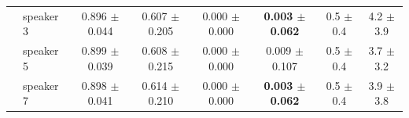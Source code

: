\begin{table}
\begin{tabular}{ll!{\vrule width 1.2pt}cc!{\vrule width 1.2pt}cc!{\vrule width 1.2pt}cc}
 & speaker 3 & 0.896 {\scriptsize $\pm$0.044} & 0.607 {\scriptsize $\pm$0.205} & 0.000 {\scriptsize $\pm$0.000} & \bfseries 0.003 {\scriptsize $\pm$0.062} & 0.5 {\scriptsize $\pm$0.4} & 4.2 {\scriptsize $\pm$3.9} \\
 & speaker 5 & 0.899 {\scriptsize $\pm$0.039} & 0.608 {\scriptsize $\pm$0.215} & 0.000 {\scriptsize $\pm$0.000} & 0.009 {\scriptsize $\pm$0.107} & 0.5 {\scriptsize $\pm$0.4} & 3.7 {\scriptsize $\pm$3.2} \\
 & speaker 7 & 0.898 {\scriptsize $\pm$0.041} & 0.614 {\scriptsize $\pm$0.210} & 0.000 {\scriptsize $\pm$0.000} & \bfseries 0.003 {\scriptsize $\pm$0.062} & 0.5 {\scriptsize $\pm$0.4} & 3.9 {\scriptsize $\pm$3.8} \\
\bottomrule
\end{tabular}
\end{table}

